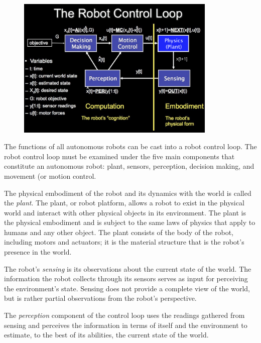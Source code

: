 \begin{figure}[!h]
\centering
\includegraphics[width=0.85\textwidth]{figures/1_control_loop_white.png}
\label{fig:1_control_loop}
\end{figure}

The functions of all autonomous robots can be cast into a robot control loop. The robot control loop must be examined under the five main components that constitute an autonomous robot: plant, sensors, perception, decision making, and movement (or motion control.

The physical embodiment of the robot and its dynamics with the world is called the \textit{plant}.  The plant, or robot platform, allows a robot to exist in the physical world and interact with other physical objects in its environment. The plant is the physical embodiment and is subject to the same laws of physics that apply to humans and any other object. The plant consists of the body of the robot, including motors and actuators; it is the material structure that is the robot's presence in the world.

The robot's \textit{sensing} is its observations about the current state of the world. The information the robot collects through its sensors serves as input for perceiving the environment's state.  Sensing does not provide a complete view of the world, but is rather partial observations from the robot's perspective.  

The \textit{perception} component of the control loop uses the readings gathered from sensing and perceives the information in terms of itself and the environment to estimate, to the best of its abilities, the current state of the world.

